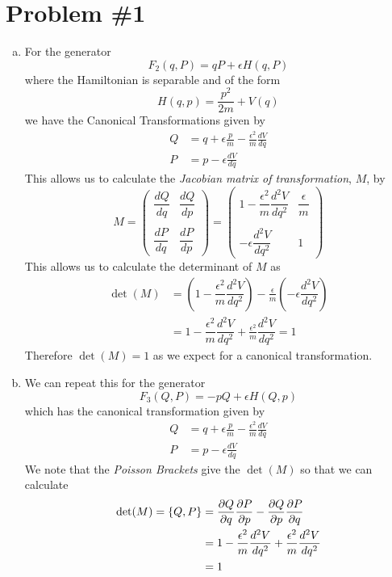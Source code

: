 \documentclass[11pt]{article}
\numberwithin{equation}{section}
\begin{document}


\section{Problem \#1}
\begin{enumerate}[(a)]
\item For the generator
$$F_2(q,P) = qP + \epsilon{H(q,P)}$$
where the Hamiltonian is separable and of the form
$$H(q,p) = \frac{p^2}{2m}+V(q)$$
we have the Canonical Transformations given by
\begin{align*}
Q &= q + \epsilon\frac{p}{m} - \frac{\epsilon^2}{m}\frac{dV}{dq}\\
P &= p - \epsilon\frac{dV}{dq}
\end{align*}
This allows us to calculate the \emph{Jacobian matrix of transformation}, $M$, by
$$M = \left(\begin{array}{cc}
      \dfrac{dQ}{dq}      &\dfrac{dQ}{dp}\\
\\
      \dfrac{dP}{dq}      &\dfrac{dP}{dp}
      \end{array}\right)
= \left(\begin{array}{cc}
      1 - \dfrac{\epsilon^2}{m}\dfrac{d^2V}{dq^2}  &\dfrac{\epsilon}{m}\\
\\
       -\epsilon\dfrac{d^2V}{dq^2}      &1
      \end{array}\right)$$
This allows us to calculate the determinant of $M$ as
\begin{align*}
\det(M) &= \left(1 - \dfrac{\epsilon^2}{m}\dfrac{d^2V}{dq^2}\right) - \frac{\epsilon}{m}\left(-\epsilon\dfrac{d^2V}{dq^2}\right)\\
&= 1 - \dfrac{\epsilon^2}{m}\dfrac{d^2V}{dq^2} + \frac{\epsilon^2}{m}\dfrac{d^2V}{dq^2} = 1
\end{align*}
Therefore $\det(M)=1$ as we expect for a canonical transformation.

\item We can repeat this for the generator
$$F_3(Q,P) = -pQ + \epsilon{H(Q,p)}$$
which has the canonical transformation given by
\begin{align*}
Q &= q + \epsilon\frac{p}{m} - \frac{\epsilon^2}{m}\frac{dV}{dq}\\
P &= p - \epsilon\frac{dV}{dq}
\end{align*}
We note that the \emph{Poisson Brackets} give the $\det(M)$ so that we can calculate
\begin{align*}
\det(M) = \{Q,P\} &= \frac{\partial{Q}}{\partial{q}}\frac{\partial{P}}{\partial{p}} - \frac{\partial{Q}}{\partial{p}}\frac{\partial{P}}{\partial{q}}\\
&= 1 - \frac{\epsilon^2}{m}\frac{d^2V}{dq^2}  + \frac{\epsilon^2}{m}\frac{d^2V}{dq^2}\\
&= 1
\end{align*}
\end{enumerate}
\end{document}
